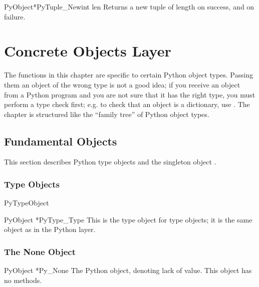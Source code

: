 \documentclass{manual}
\begin{document}
\begin{cfuncdesc}{PyObject*}{PyTuple_New}{int len}
Returns a new tuple of length  on success, and \NULL{} on
failure.
\end{cfuncdesc}


\chapter{Concrete Objects Layer \label{concrete}}

The functions in this chapter are specific to certain Python object
types.  Passing them an object of the wrong type is not a good idea;
if you receive an object from a Python program and you are not sure
that it has the right type, you must perform a type check first;
e.g. to check that an object is a dictionary, use
.  The chapter is structured like the
``family tree'' of Python object types.


\section{Fundamental Objects \label{fundamental}}

This section describes Python type objects and the singleton object 
.


\subsection{Type Objects \label{typeObjects}}

\begin{ctypedesc}{PyTypeObject}

\end{ctypedesc}

\begin{cvardesc}{PyObject *}{PyType_Type}
This is the type object for type objects; it is the same object as
 in the Python layer.
\end{cvardesc}


\subsection{The None Object \label{noneObject}}

\begin{cvardesc}{PyObject *}{Py_None}
The Python  object, denoting lack of value.  This object has
no methods.
\end{cvardesc}
\end{document}
